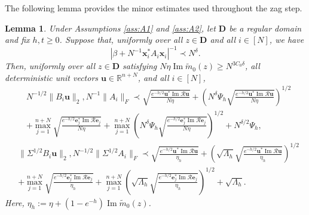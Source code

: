 \documentclass[11pt,reqno]{amsart}
\def\R{\mathbb{R}}
\def\e{\mathbf{e}}
\def\u{\mathbf{u}}
\def\x{\mathbf{x}}
\def\cR{\mathcal{R}}
\def\bD{\mathbf{D}}
\def\Im{\operatorname{Im}}
\newtheorem{lemma}[theorem]{Lemma}
\theoremstyle{definition}
\numberwithin{equation}{section}
\numberwithin{figure}{section}
\begin{document}
The following lemma provides the minor estimates used throughout the zag step.
\begin{lemma}\label{lem:minor-estimates}
Under Assumptions \ref{ass:A1} and \ref{ass:A2}, let $\bD$ be a regular domain and fix $h,t\geq 0$. Suppose that, uniformly over all $z\in\bD$ and all $i\in[N]$, we have
\[
    |\beta+N^{-1}\x_i^*A_i\x_i|^{-1}\prec N^\delta.
\]
Then, uniformly over all $z\in\bD$ satisfying $N\eta\Im\widetilde m_0(z)\geq N^{3C_0\delta}$, all deterministic unit vectors $\u\in\R^{n+N}$, and all $i\in[N]$,
\begin{align*}
    &N^{-1/2}\|B_i\u\|_2,N^{-1}\|A_i\|_F\prec\sqrt{\frac{e^{-h/2}\u^*\Im\cR\u}{N\eta}}+\left(N^\delta\Psi_h\sqrt{\frac{e^{-h/2}\u^*\Im\cR\u}{N\eta}}\right)^{1/2}\\
    &+\max_{j=1}^{n+N}\sqrt{\frac{e^{-h/2}\e_j^*\Im\cR\e_j}{N\eta}}+\max_{j=1}^{n+N}\left(N^\delta\Psi_h\sqrt{\frac{e^{-h/2}\e_j^*\Im\cR\e_j}{N\eta}}\right)^{1/2}+N^{\delta/2}\Psi_h,
\end{align*}
\begin{align*}
&\|\Sigma^{1/2}B_i\u\|_2,N^{-1/2}\|\Sigma^{1/2}A_i\|_F\prec\sqrt{\frac{e^{-h/2}\u^*\Im\cR\u}{\eta_h}}+\left(\sqrt{\Lambda_h}\sqrt{\frac{e^{-h/2}\u^*\Im\cR\u}{\eta_h}}\right)^{1/2}\\
&+\max_{j=1}^{n+N}\sqrt{\frac{e^{-h/2}\e_j^*\Im\cR\e_j}{\eta_h}}+\max_{j=1}^{n+N}\left(\sqrt{\Lambda_h}\sqrt{\frac{e^{-h/2}\e_j^*\Im\cR\e_j}{\eta_h}}\right)^{1/2}+\sqrt{\Lambda_h}.
\end{align*}
Here, $\eta_h:=\eta+(1-e^{-h})\Im\widetilde m_0(z)$.
\end{lemma}
\end{document}
